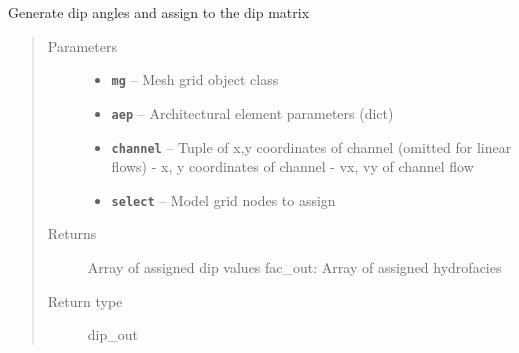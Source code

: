 \documentclass[letterpaper,10pt,english]{sphinxmanual}
\begin{document}
\begin{fulllineitems}
\label{hyvr:hyvr.hyvr.sim.dip_sets}
Generate dip angles and assign to the dip matrix
\begin{quote}\begin{description}
\item[{Parameters}] \leavevmode\begin{itemize}
\item {} 
\textbf{\texttt{mg}} -- Mesh grid object class

\item {} 
\textbf{\texttt{aep}} -- Architectural element parameters (dict)

\item {} 
\textbf{\texttt{channel}} -- Tuple of x,y coordinates of channel (omitted for linear flows)
- x, y coordinates of channel
- vx, vy of channel flow

\item {} 
\textbf{\texttt{select}} -- Model grid nodes to assign

\end{itemize}

\item[{Returns}] \leavevmode
Array of assigned dip values
fac\_out:    Array of assigned hydrofacies

\item[{Return type}] \leavevmode
dip\_out

\end{description}\end{quote}

\end{fulllineitems}

\end{document}
